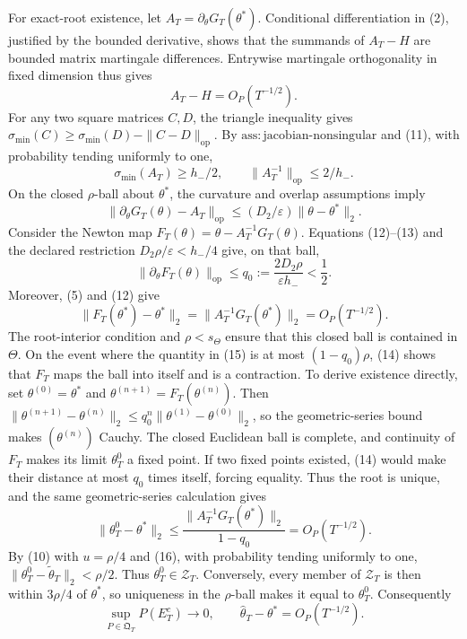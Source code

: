 For exact-root existence, let \(A_T=\partial_\theta G_T(\theta^*)\). Conditional differentiation in (2), justified by the bounded derivative, shows that the summands of \(A_T-H\) are bounded matrix martingale differences. Entrywise martingale orthogonality in fixed dimension thus gives
\[
 A_T-H=O_P(T^{-1/2}).
\tag{11}
\]
For any two square matrices \(C,D\), the triangle inequality gives \(\sigma_{\min}(C)\ge\sigma_{\min}(D)-\|C-D\|_{\mathrm{op}}\). By \(\mathrm{ass:jacobian\text{-}nonsingular}\) and (11), with probability tending uniformly to one,
\[
 \sigma_{\min}(A_T)\ge h_-/2,
 \qquad \|A_T^{-1}\|_{\mathrm{op}}\le2/h_-.
\tag{12}
\]
On the closed \(\rho\)-ball about \(\theta^*\), the curvature and overlap assumptions imply
\[
 \|\partial_\theta G_T(\theta)-A_T\|_{\mathrm{op}}
 \le (D_2/\varepsilon)\|\theta-\theta^*\|_2.
\tag{13}
\]
Consider the Newton map \(F_T(\theta)=\theta-A_T^{-1}G_T(\theta)\). Equations (12)--(13) and the declared restriction \(D_2\rho/\varepsilon<h_-/4\) give, on that ball,
\[
 \|\partial_\theta F_T(\theta)\|_{\mathrm{op}}
 \le q_0:=\frac{2D_2\rho}{\varepsilon h_-}<\frac12.
\tag{14}
\]
Moreover, (5) and (12) give
\[
 \|F_T(\theta^*)-\theta^*\|_2
 =\|A_T^{-1}G_T(\theta^*)\|_2=O_P(T^{-1/2}).
\tag{15}
\]
The root-interior condition and \(\rho<s_\Theta\) ensure that this closed ball is contained in \(\Theta\). On the event where the quantity in (15) is at most \((1-q_0)\rho\), (14) shows that \(F_T\) maps the ball into itself and is a contraction. To derive existence directly, set \(\theta^{(0)}=\theta^*\) and \(\theta^{(n+1)}=F_T(\theta^{(n)})\). Then \(\|\theta^{(n+1)}-\theta^{(n)}\|_2\le q_0^n\|\theta^{(1)}-\theta^{(0)}\|_2\), so the geometric-series bound makes \((\theta^{(n)})\) Cauchy. The closed Euclidean ball is complete, and continuity of \(F_T\) makes its limit \(\theta_T^0\) a fixed point. If two fixed points existed, (14) would make their distance at most \(q_0\) times itself, forcing equality. Thus the root is unique, and the same geometric-series calculation gives
\[
 \|\theta_T^0-\theta^*\|_2
 \le\frac{\|A_T^{-1}G_T(\theta^*)\|_2}{1-q_0}
 =O_P(T^{-1/2}).
\tag{16}
\]
By (10) with \(u=\rho/4\) and (16), with probability tending uniformly to one, \(\|\theta_T^0-\widetilde\theta_T\|_2<\rho/2\). Thus \(\theta_T^0\in\mathcal Z_T\). Conversely, every member of \(\mathcal Z_T\) is then within \(3\rho/4\) of \(\theta^*\), so uniqueness in the \(\rho\)-ball makes it equal to \(\theta_T^0\). Consequently
\[
 \sup_{P\in\mathfrak Q_T}P(E_T^c)\longrightarrow0,
 \qquad \widehat\theta_T-\theta^*=O_P(T^{-1/2}).
\tag{17}
\]

